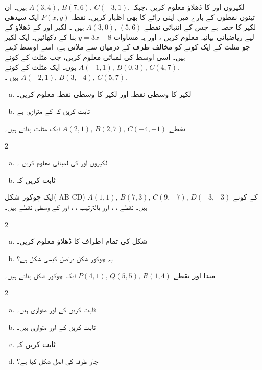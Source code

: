 لکیروں    اور    کا ڈھلاؤ معلوم کریں ،جبکہ  \( A (3,4), \, B (7,6), \, C (-3,1). \) ہیں۔ ان تینوں نقطوں کے بارے میں اپنی رائے کا بھی اظہار کریں۔
نقطہ  \( P(x,y) \) ایک سیدھی لکیر کا حصہ ہے جس کے انتہائی نقطے  \(A(3,0), \, (5,6) \) ہیں ۔ لکیر    اور     کے ڈھلاؤ کے لیے ریاضیاتی بیانیہ معلوم کریں ، اور یہ مساوات    \( y=3x-8 \) بنا کے دکھائیں۔
ایک لکیر جو مثلث کے ایک کونے کو مخالف طرف کے درمیان سے ملاتی ہے، اسے اوسط کہتے ہیں۔ اسی اوسط    کی لمبائی معلوم کریں، جب مثلث کے کونے \( A(-1,1), \, B(0,3), \, C(4,7). \) ہوں۔
ایک مثلث  کے کونے \( A(-2,1), \, B(3,-4), \, C( 5,7). \) ہیں ۔
\begin{enumerate}[a.]
\item
لکیر  کا وسطی نقطہ   اور لکیر      کا وسطی نقطہ     معلوم کریں۔
\item
ثابت کریں کہ       کے      متوازی ہے 
\end{enumerate}
نقطے  \( A(2,1), \, B(2,7), \, C(-4,-1) \) ایک مثلث بناتے ہیں۔ 
\begin{multicols}{2}
\begin{enumerate}[a.]
\item
لکیروں     اور  کی لمبائی معلوم کریں ۔
\item
ثابت کریں کہ  
\end{enumerate}
\end{multicols}
ایک چوکور شکل( AB CD)  کے کونے \( A(1,1), \, B(7,3), \, C(9,-7), \, D(-3,-3) \) ہیں۔ نقطے   ،   ،     اور      بالترتیب   ، ،    اور  کے وسطی نقطے ہیں۔
\begin{multicols}{2}
\begin{enumerate}[a.]
\item
شکل  کی تمام اطراف کا ڈھلاؤ معلوم کریں۔ 
\item
 یہ چوکور شکل   دراصل کیسی شکل ہے؟
\end{enumerate}
\end{multicols}
مبدا  اور     نقطے \( P(4,1), \, Q(5,5), \, R(1,4) \) ایک چوکور شکل بناتے ہیں۔ 
\begin{multicols}{2}
\begin{enumerate}[a.]
\item
ثابت کریں کے       اور    متوازی ہیں۔
\item
ثابت کریں کے اور    متوازی ہیں۔
\item
ثابت کریں کہ 
\item
چار طرفہ  کی اصل شکل کیا ہے؟
\end{enumerate}
\end{multicols}
